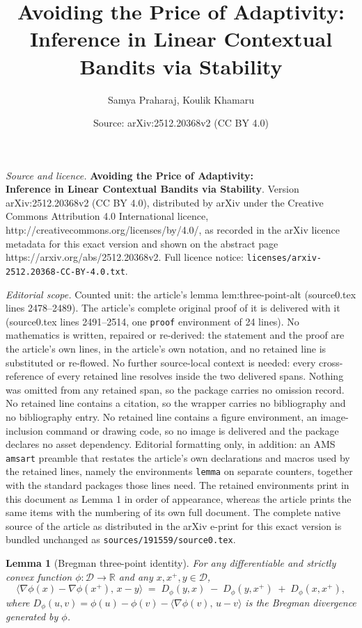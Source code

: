 \documentclass[10pt,a4paper]{amsart}
\title{\LARGE \textbf{Avoiding the Price of Adaptivity: \\ Inference in Linear Contextual Bandits via Stability}}
\author{Samya Praharaj, Koulik Khamaru}
\date{Source: arXiv:2512.20368v2 (CC BY 4.0)}
\newtheorem{lemma}{Lemma}
\begin{document}
\maketitle

\noindent\emph{Source and licence.} \LARGE \textbf{Avoiding the Price of Adaptivity: \\ Inference in Linear Contextual Bandits via Stability}. Version arXiv:2512.20368v2 (CC BY 4.0), distributed by arXiv under the Creative Commons Attribution 4.0 International licence, http://creativecommons.org/licenses/by/4.0/, as recorded in the arXiv licence metadata for this exact version and shown on the abstract page https://arxiv.org/abs/2512.20368v2. Full licence notice: \texttt{licenses/arxiv-2512.20368-CC-BY-4.0.txt}.\par\smallskip

\noindent\textit{Editorial scope.} Counted unit: the article's lemma lem:three-point-alt (source0.tex lines 2478--2489). The article's complete original proof of it is delivered with it (source0.tex lines 2491--2514, one \texttt{proof} environment of 24 lines). No mathematics is written, repaired or re-derived: the statement and the proof are the article's own lines, in the article's own notation, and no retained line is substituted or re-flowed.  No further source-local context is needed: every cross-reference of every retained line resolves inside the two delivered spans.  Nothing was omitted from any retained span, so the package carries no omission record.  No retained line contains a citation, so the wrapper carries no bibliography and no bibliography entry.  No retained line contains a figure environment, an image-inclusion command or drawing code, so no image is delivered and the package declares no asset dependency.  Editorial formatting only, in addition: an AMS \texttt{amsart} preamble that restates the article's own declarations and macros used by the retained lines, namely the environments \texttt{lemma} on separate counters, together with the standard packages those lines need.  The retained environments print in this document as Lemma 1 in order of appearance, whereas the article prints the same items with the numbering of its own full document.  The complete native source of the article as distributed in the arXiv e-print for this exact version is bundled unchanged as \texttt{sources/191559/source0.tex}.
\begin{lemma}[Bregman three-point identity]
\label{lem:three-point-alt}
For any differentiable and strictly convex function $\phi:\mathcal{D}\to\mathbb{R}$ 
and any $x, x^+, y \in \mathcal{D}$,
\[
\big\langle \nabla\phi(x)-\nabla\phi(x^+),\, x - y \big\rangle
\;=\;
D_\phi(y,x)\;-\;D_\phi(y,x^+)\;+\;D_\phi(x,x^+),
\]
where $D_\phi(u,v)=\phi(u)-\phi(v)-\langle\nabla\phi(v),\,u-v\rangle$ 
is the Bregman divergence generated by $\phi$.
\end{lemma}
\end{document}
